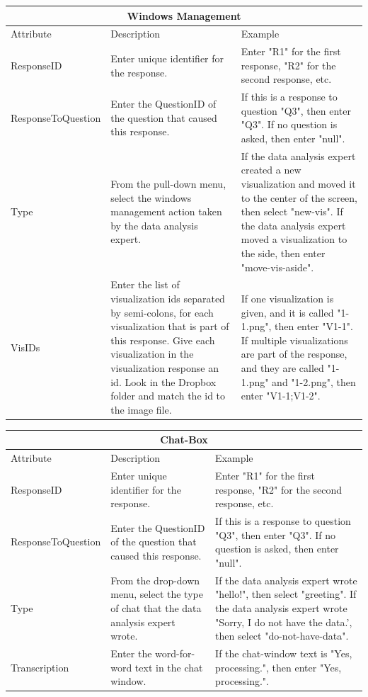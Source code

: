 \documentclass[]{article}
\begin{document}
\begin{itemize}
\begin{tabular}{ |p{4cm}|p{5cm}|p{5cm}|  }
\hline
\multicolumn{3}{|c|}{Windows Management} \\
\hline
Attribute& Description & Example \\
\hline
ResponseID & Enter unique identifier for the response. & Enter "R1" for the first response, "R2" for the second response, etc. \\
ResponseToQuestion & Enter the QuestionID of the question that caused this response. & If this is a response to question "Q3", then enter "Q3". If no question is asked, then enter "null". \\
Type & From the pull-down menu, select the windows management action taken by the data analysis expert. & If the data analysis expert created a new visualization and moved it to the center of the screen, then select "new-vis". If the data analysis expert moved a visualization to the side, then enter "move-vis-aside". \\
VisIDs & Enter the list of visualization ids separated by semi-colons, for each visualization that is part of this response.  Give each visualization in the visualization response an id.  Look in the Dropbox folder and match the id to the image file. & If one visualization is given, and it is called "1-1.png", then enter "V1-1". If multiple visualizations are part of the response, and they are called "1-1.png" and "1-2.png", then enter "V1-1;V1-2". \\
\hline
\end{tabular}

\begin{tabular}{ |p{4cm}|p{5cm}|p{5cm}|  }
\hline
\multicolumn{3}{|c|}{Chat-Box} \\
\hline
Attribute& Description & Example \\
\hline
ResponseID & Enter unique identifier for the response. & Enter "R1" for the first response, "R2" for the second response, etc. \\
ResponseToQuestion & Enter the QuestionID of the question that caused this response. & If this is a response to question "Q3", then enter "Q3". If no question is asked, then enter "null". \\
Type & From the drop-down menu, select the type of chat that the data analysis expert wrote. & If the data analysis expert wrote "hello!", then select "greeting". If the data analysis expert wrote "Sorry, I do not have the data.', then select "do-not-have-data". \\
Transcription & Enter the word-for-word text in the chat window. & If the chat-window text is "Yes, processing.", then enter "Yes, processing.".\\
\hline
\end{tabular}


\end{itemize}
\end{document}
